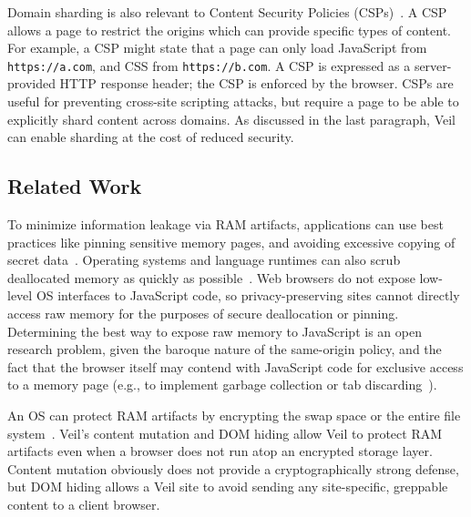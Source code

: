 Domain sharding is also relevant to Content Security
Policies (CSPs)~\cite{csp}. A CSP allows a page to restrict the
origins which can provide specific types of content.
For example, a CSP might state that a page can only
load JavaScript from \texttt{https://a.com}, and CSS
from \texttt{https://b.com}. A CSP is expressed as a
server-provided HTTP response header; the CSP is enforced
by the browser. CSPs are useful for preventing cross-site
scripting attacks, but require a page to be able to
explicitly shard content across domains. As discussed
in the last paragraph, Veil can enable sharding at
the cost of reduced security.

\subsection{Related Work}
\label{sec:related}


To minimize information leakage via RAM artifacts,
applications can use best practices like pinning
sensitive memory pages, and avoiding excessive
copying of secret data~\cite{harrison07}.
Operating systems and language runtimes can also
scrub deallocated memory as quickly as
possible~\cite{chow05}. Web browsers do not expose
low-level OS interfaces to JavaScript code, so
privacy-preserving sites cannot directly access
raw memory for the purposes of secure deallocation
or pinning. Determining the best way to expose
raw memory to JavaScript is an open research problem,
given the baroque nature of the same-origin policy,
and the fact that the browser itself may contend
with JavaScript code for exclusive access to a
memory page (e.g., to implement garbage collection
or tab discarding~\cite{tabDiscarding}).

An OS can protect RAM artifacts by encrypting
the swap space or the entire file system~\cite{blaze93,provos00,cryptfs}.
Veil's content mutation and DOM hiding allow Veil
to protect RAM artifacts even when a browser does not
run atop an encrypted storage layer. Content mutation
obviously does not provide a cryptographically strong
defense, but DOM hiding allows a Veil site to avoid
sending any site-specific, greppable content to a
client browser.

